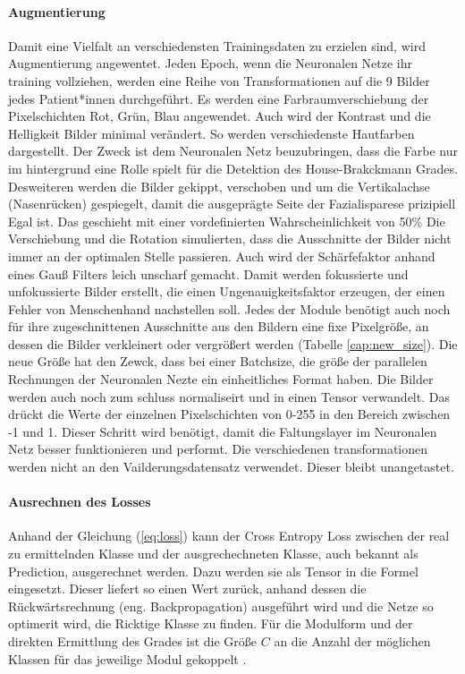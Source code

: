 \paragraph{Augmentierung} Damit eine Vielfalt an verschiedensten Trainingsdaten zu erzielen sind, wird Augmentierung angewentet. Jeden Epoch, wenn die Neuronalen Netze ihr training vollziehen, werden eine Reihe von Transformationen auf die 9 Bilder jedes Patient*innen durchgeführt. Es werden eine Farbraumverschiebung der Pixelschichten Rot, Grün, Blau angewendet. Auch wird der Kontrast und die Helligkeit Bilder minimal verändert. So werden verschiedenste Hautfarben dargestellt. Der Zweck ist dem Neuronalen Netz beuzubringen, dass die Farbe nur im hintergrund eine Rolle spielt für die Detektion des House-Brakckmann Grades. Desweiteren werden die Bilder gekippt, verschoben und um die Vertikalachse (Nasenrücken) gespiegelt, damit die ausgeprägte Seite der Fazialisparese prizipiell Egal ist. Das geschieht mit einer vordefinierten Wahrscheinlichkeit von 50\% Die Verschiebung und die Rotation simulierten, dass die Ausschnitte der Bilder nicht immer an der optimalen Stelle passieren. Auch wird der Schärfefaktor anhand eines Gauß Filters leich unscharf gemacht. Damit werden fokussierte und unfokussierte Bilder erstellt, die einen Ungenauigkeitsfaktor erzeugen, der einen Fehler von Menschenhand nachstellen soll. Jedes der Module benötigt auch noch für ihre zugeschnittenen Ausschnitte aus den Bildern eine fixe Pixelgröße, an dessen die Bilder verkleinert oder vergrößert werden (Tabelle \ref{cap:new_size}). Die neue Größe hat den Zewck, dass bei einer Batchsize, die größe der parallelen Rechnungen der Neuronalen Nezte ein einheitliches Format haben. Die Bilder werden auch noch zum schluss normaliseirt und in einen Tensor verwandelt. Das drückt die Werte der einzelnen Pixelschichten von 0-255 in den Bereich zwischen -1 und 1. Dieser Schritt wird benötigt, damit die Faltungslayer im Neuronalen Netz besser funktionieren und performt. Die verschiedenen transformationen werden nicht an den Vailderungsdatensatz verwendet. Dieser bleibt unangetastet.

\clearpage
\paragraph{Ausrechnen des Losses} Anhand der Gleichung (\ref{eq:loss}) kann der Cross Entropy Loss zwischen der real zu ermittelnden Klasse und der ausgrechechneten Klasse, auch bekannt als Prediction, ausgerechnet werden. Dazu werden sie als Tensor in die Formel eingesetzt. Dieser liefert so einen Wert zurück, anhand dessen die Rückwärtsrechnung (eng. Backpropagation) ausgeführt wird und die Netze so optimerit wird, die Ricktige Klasse zu finden. Für die Modulform und der direkten Ermittlung des Grades ist die Größe $C$ an die Anzahl der möglichen Klassen für das jeweilige Modul gekoppelt \cite{pytorch}.

